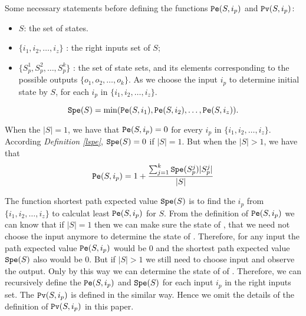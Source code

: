 Some necessary statements before defining the functions $\Pe(S, i_p)$ and ${\tt Pv}(S, i_p)$:
\begin{itemize}
  \item $S$: the set of states.
  \item $\{i_1,i_2,\ldots, i_z\}$ : the right inputs set of $S$;
  \item $\{S_p^1,S_p^2,\ldots, S_p^k\}$ : the set of state sets, and its elements corresponding to the possible outputs $\{o_1,o_2,\ldots,o_k\}$. As we choose the input $i_p$ to determine initial state by $S$, for each $i_p$ in $\{i_1,i_2,\ldots, i_z\}$.
\end{itemize} 
\begin{definition}[$\Spe(S)$] \label{lspe}
 \[{\tt Spe}(S)= \min({\tt Pe}(S, i_1),{\tt Pe}(S, i_2),\ldots,{\tt Pe}(S, i_z)).\] 
\end{definition}

\begin{definition}[$\Pe(S, i_p)$] 
When the $|S|=1$, we have that
${\tt Pe}(S, i_p)=0$  for every $i_p$ in $\{i_1,i_2,\ldots, i_z\}$. According {\em Definition \ref{lspe}}, ${\tt Spe}(S)=0$ if $|S|=1$. But when the $|S|>1$, 
we have that  
\[{\tt Pe}(S, i_p)=1 +\frac{\sum_{j=1}^k {\tt Spe}(S_p^j)|S_p^j|}{ |S|}\] 
\end{definition}

The function shortest path  expected value $\Spe(S)$ is to find the $i_p$ from $\{i_1,i_2,\ldots, i_z\}$ to calculat least $\Pe(S, i_p)$ for $S$. From the definition of $\Pe(S, i_p)$ we can know that if $|S|=1$ then we can make sure the state of \BCNs, that we need not choose the input anymore to determine the state of \BCNs. Therefore, for any input the path expected value $\Pe(S, i_p)$ would be $0$ and the shortest path expected value $\Spe(S)$ also would be $0$. But if $|S|>1$ we still need to choose input and observe the output. Only by this way we can determine the state of of \BCNs. Therefore, we can recursively define the $\Pe(S, i_p)$ and $\Spe(S)$ for each input $i_p$ in the right inputs set. The ${\tt Pv}(S, i_p)$ is defined in the similar way. Hence we omit the details of the definition of ${\tt Pv}(S, i_p)$ in this paper. \\

